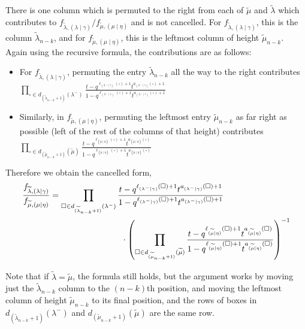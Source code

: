 \documentclass[ALCO]{cedram}
\newcommand{\nudom}{{( \lambda \mid \gamma )}}
\newcommand{\lambdagamma}{{\nudom}}
\newcommand{\mueta}{{(\mu \mid \eta)}}
\newcommand{\mutilde}{{\widetilde{\mu}}}
\newcommand{\lambdatilde}{{\widetilde{\lambda}}}
\newcommand{\lambdamingamma}{(\lambda^- \mid \gamma)}
\newcommand{\flambdatilde}{f_{\lambdatilde , \lambdagamma}}
\newcommand{\mutildeeta}{{(\mutilde \mid \eta)}}
\newcommand{\fmutilde}{f_{\mutilde, \mueta}}
\begin{document}
There is one column which is permuted to the right from each of $\mutilde$ and $\lambdatilde$ which contributes to $\flambdatilde/\fmutilde$ and is not cancelled. For $\flambdatilde$, this is the column $\lambdatilde_{n-k}$, and for $\fmutilde$, this is the leftmost column of height $\mutilde_{n-k}$. Again using the recursive formula, the contributions are as follows:
\begin{itemize}
    \item For $\flambdatilde$, permuting the entry $\lambdatilde_{n-k}$ all the way to the right contributes\\ $\displaystyle{\prod_{ \square \in d_{(\lambdatilde_{n-k}+1)}(\lambda^-)}\frac{t-q^{\ell_{\lambdamingamma}(\square)+1}t^{a_{\lambdamingamma}(\square)+1}}{1-q^{\ell_{\lambdamingamma}(\square)+1}t^{a_{\lambdamingamma}(\square)+1}}}$\\
    \item Similarly, in $\fmutilde$, permuting the leftmost entry $\mutilde_{n-k}$ as far right as possible (left of the rest of the columns of that height) contributes\\
    $\displaystyle{\prod_{\square \in d_{(\mutilde_{n-k}+1)}(\mutilde)}\frac{t-q^{\ell_{\mutildeeta}(\square)+1}t^{a_{\mutildeeta}(\square)}}{1-q^{\ell_{\mutildeeta}(\square)+1}t^{a_{\mutildeeta}(\square)}}}$
\end{itemize}
Therefore we obtain the cancelled form,
\begin{align*} \frac{\flambdatilde}{\fmutilde} &= \prod_{ \square \in d_{(\lambdatilde_{n-k}+1)}(\lambda^-)}\frac{t-q^{\ell_{\lambdamingamma}(\square)+1}t^{a_{\lambdamingamma}(\square)+1}}{1-q^{\ell_{\lambdamingamma}(\square)+1}t^{a_{\lambdamingamma}(\square)+1}} \\ & \hspace*{3cm}\cdot \left( \prod_{ \square \in d_{(\mutilde_{n-k}+1)}(\mutilde)}\frac{t-q^{\ell_{\mutildeeta}(\square)+1}t^{a_{\mutildeeta}(\square)}}{1-q^{\ell_{\mutildeeta}(\square)+1}t^{a_{\mutildeeta}(\square)}}\right)^{-1} \end{align*}

Note that if $\lambdatilde=\mutilde$, the formula still holds, but the argument works by moving just the $\lambdatilde_{n-k}$ column to the $(n-k)$th position, and moving the leftmost column of height $\mutilde_{n-k}$ to its final position, and the rows of boxes in $d_{(\lambdatilde_{n-k}+1)}(\lambda^-) $ and $d_{(\mutilde_{n-k}+1)}(\mutilde)$ are the same row.
\end{document}
